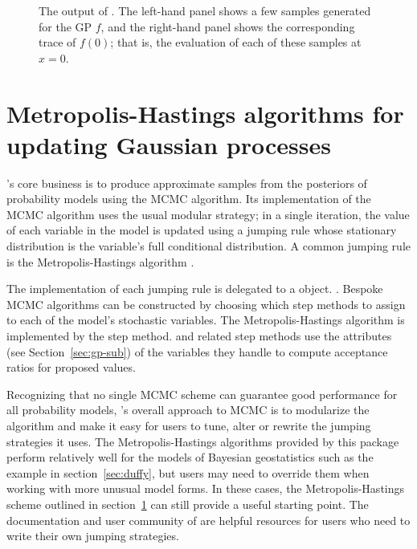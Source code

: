 \documentclass[article]{jss}
\begin{document}
\begin{figure}
    \centering
    \caption{The output of . The left-hand panel shows a few samples generated for the GP $f$, and the right-hand panel shows the corresponding trace of $f(0)$; that is, the evaluation of each of these samples at $x=0$.}
    \label{fig:MCMCOutput}
\end{figure}
 

\section{Metropolis-Hastings algorithms for updating Gaussian processes}
\label{sec:step-methods}

's core business is to produce approximate samples from the posteriors of probability models using the MCMC algorithm. Its implementation of the MCMC algorithm uses the usual modular strategy; in a single iteration, the value of each variable in the model is updated using a jumping rule whose stationary distribution is the variable's full conditional distribution. A common jumping rule is the Metropolis-Hastings algorithm \citep{gamerman}. 

The implementation of each jumping rule is delegated to a  object. \citep{pymc}. Bespoke MCMC algorithms can be constructed by choosing which step methods to assign to each of the model's stochastic variables. The Metropolis-Hastings algorithm \citep{gamerman} is implemented by the  step method.  and related step methods use the  attributes (see Section~\ref{sec:gp-sub}) of the variables they handle to compute acceptance ratios for proposed values. 

\bigskip
Recognizing that no single MCMC scheme can guarantee good performance for all probability models, 's overall approach to MCMC is to modularize the algorithm and make it easy for users to tune, alter or rewrite the jumping strategies it uses. The Metropolis-Hastings algorithms provided by this package perform relatively well for the models of Bayesian geostatistics such as the example in section~\ref{sec:duffy}, but users may need to override them when working with more unusual model forms. In these cases, the Metropolis-Hastings scheme outlined in section~\ref{sec:step-methods} can still provide a useful starting point. The documentation and user community of  are helpful resources for users who need to write their own jumping strategies. 
\end{document}
